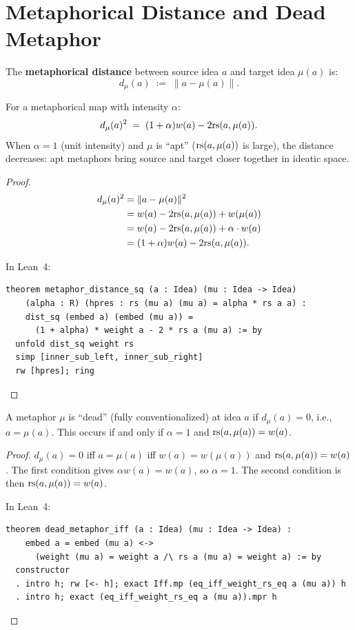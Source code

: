 \section{Metaphorical Distance and Dead Metaphor}

\begin{definition}
\label{def:metaphor-distance}
The \textbf{metaphorical distance} between source idea $a$ and target idea
$\mu(a)$ is:
\[
  d_\mu(a) \;:=\; \|a - \mu(a)\|.
\]
\end{definition}

\begin{theorem}
\label{thm:distance-intensity}
For a metaphorical map with intensity $\alpha$:
\[
  d_\mu(a)^2 \;=\; (1 + \alpha) w(a) - 2\mathrm{rs}(a, \mu(a)).
\]
When $\alpha = 1$ (unit intensity) and $\mu$ is ``apt'' ($\mathrm{rs}(a, \mu(a))$ is
large), the distance decreases: apt metaphors bring source and target closer
together in ideatic space.
\end{theorem}

\begin{proof}
\begin{align*}
  d_\mu(a)^2 &= \|a - \mu(a)\|^2 \\
  &= w(a) - 2\mathrm{rs}(a, \mu(a)) + w(\mu(a)) \\
  &= w(a) - 2\mathrm{rs}(a, \mu(a)) + \alpha \cdot w(a) \\
  &= (1 + \alpha) w(a) - 2\mathrm{rs}(a, \mu(a)).
\end{align*}

In Lean~4:
\begin{lstlisting}
theorem metaphor_distance_sq (a : Idea) (mu : Idea -> Idea)
    (alpha : R) (hpres : rs (mu a) (mu a) = alpha * rs a a) :
    dist_sq (embed a) (embed (mu a)) =
      (1 + alpha) * weight a - 2 * rs a (mu a) := by
  unfold dist_sq weight rs
  simp [inner_sub_left, inner_sub_right]
  rw [hpres]; ring
\end{lstlisting}
\end{proof}

\begin{theorem}
\label{thm:dead-metaphor}
A metaphor $\mu$ is ``dead'' (fully conventionalized) at idea $a$ if
$d_\mu(a) = 0$, i.e., $a = \mu(a)$.  This occurs if and
only if $\alpha = 1$ and $\mathrm{rs}(a, \mu(a)) = w(a)$.
\end{theorem}

\begin{proof}
$d_\mu(a) = 0$ iff $a = \mu(a)$ iff $w(a) = w(\mu(a))$
and $\mathrm{rs}(a, \mu(a)) = w(a)$.  The first condition gives $\alpha w(a) = w(a)$,
so $\alpha = 1$.  The second condition is then $\mathrm{rs}(a, \mu(a)) = w(a)$.

In Lean~4:
\begin{lstlisting}
theorem dead_metaphor_iff (a : Idea) (mu : Idea -> Idea) :
    embed a = embed (mu a) <->
      (weight (mu a) = weight a /\ rs a (mu a) = weight a) := by
  constructor
  . intro h; rw [<- h]; exact Iff.mp (eq_iff_weight_rs_eq a (mu a)) h
  . intro h; exact (eq_iff_weight_rs_eq a (mu a)).mpr h
\end{lstlisting}
\end{proof}

